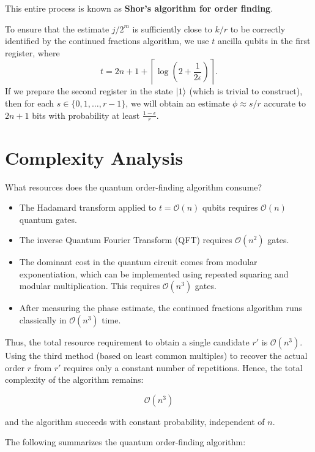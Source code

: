 This entire process is known as \textbf{Shor's algorithm for order finding}.

\medskip

To ensure that the estimate $j/2^m$ is sufficiently close to $k/r$ to be correctly identified by the continued fractions algorithm, we use $t$ ancilla qubits in the first register, where
\[
t = 2n + 1 + \left\lceil \log\left(2 + \frac{1}{2\epsilon} \right) \right\rceil.
\]
If we prepare the second register in the state $\ket{1}$ (which is trivial to construct), then for each $s \in \{0, 1, \ldots, r - 1\}$, we will obtain an estimate $\phi \approx s/r$ accurate to $2n + 1$ bits with probability at least $\frac{1 - \epsilon}{r}$.

\section{Complexity Analysis}

What resources does the quantum order-finding algorithm consume?

\begin{itemize}
    \item The Hadamard transform applied to $t = \mathcal{O}(n)$ qubits requires $\mathcal{O}(n)$ quantum gates.
    
    \item The inverse Quantum Fourier Transform (QFT) requires $\mathcal{O}(n^2)$ gates.
    
    \item The dominant cost in the quantum circuit comes from modular exponentiation, which can be implemented using repeated squaring and modular multiplication. This requires $\mathcal{O}(n^3)$ gates.
    
    \item After measuring the phase estimate, the continued fractions algorithm runs classically in $\mathcal{O}(n^3)$ time.
\end{itemize}

Thus, the total resource requirement to obtain a single candidate $r'$ is $\mathcal{O}(n^3)$. Using the third method (based on least common multiples) to recover the actual order $r$ from $r'$ requires only a constant number of repetitions. Hence, the total complexity of the algorithm remains:

\[
\mathcal{O}(n^3)
\]

and the algorithm succeeds with constant probability, independent of $n$.

The following summarizes the quantum order-finding algorithm:

